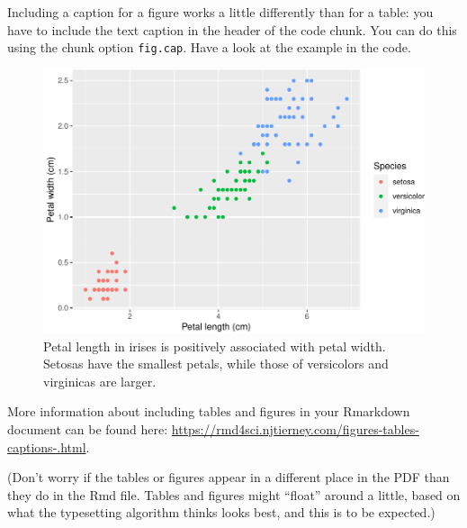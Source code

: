 \documentclass[
]{article}
\begin{document}
Including a caption for a figure works a little differently than for a
table: you have to include the text caption in the header of the code
chunk. You can do this using the chunk option \texttt{fig.cap}. Have a
look at the example in the code.

\begin{figure}
\centering
\includegraphics{s2-analysis_files/figure-latex/figure-example-1.pdf}
\caption{Petal length in irises is positively associated with petal
width. Setosas have the smallest petals, while those of versicolors and
virginicas are larger.}
\end{figure}

More information about including tables and figures in your Rmarkdown
document can be found here:
\url{https://rmd4sci.njtierney.com/figures-tables-captions-.html}.

(Don't worry if the tables or figures appear in a different place in the
PDF than they do in the Rmd file. Tables and figures might ``float''
around a little, based on what the typesetting algorithm thinks looks
best, and this is to be expected.)
\end{document}
